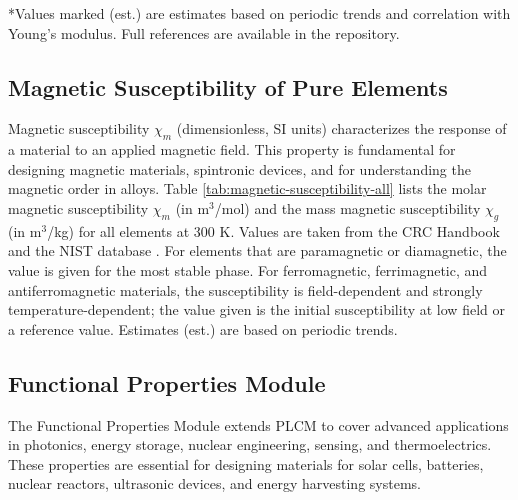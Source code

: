 \documentclass[12pt,a4paper]{article}
\begin{document}
	*Values marked (est.) are estimates based on periodic trends and correlation with Young's modulus. Full references are available in the repository.
	
	\subsection{Magnetic Susceptibility of Pure Elements}
	\label{subsec:magnetic-susceptibility}
	
	Magnetic susceptibility \(\chi_m\) (dimensionless, SI units) characterizes the response of a material to an applied magnetic field. This property is fundamental for designing magnetic materials, spintronic devices, and for understanding the magnetic order in alloys. Table \ref{tab:magnetic-susceptibility-all} lists the molar magnetic susceptibility \(\chi_m\) (in m\(^3\)/mol) and the mass magnetic susceptibility \(\chi_g\) (in m\(^3\)/kg) for all elements at 300 K. Values are taken from the CRC Handbook \cite{CRC} and the NIST database \cite{NIST}. For elements that are paramagnetic or diamagnetic, the value is given for the most stable phase. For ferromagnetic, ferrimagnetic, and antiferromagnetic materials, the susceptibility is field-dependent and strongly temperature-dependent; the value given is the initial susceptibility at low field or a reference value. Estimates (est.) are based on periodic trends.
	
	
	\subsection{Functional Properties Module}
	\label{subsec:functional-properties}
	
	The Functional Properties Module extends PLCM to cover advanced applications in photonics, energy storage, nuclear engineering, sensing, and thermoelectrics. These properties are essential for designing materials for solar cells, batteries, nuclear reactors, ultrasonic devices, and energy harvesting systems.
	
\end{document}

